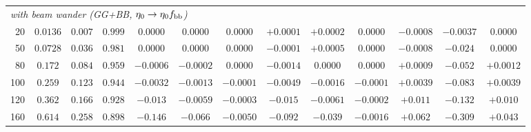 \documentclass[11pt,a4paper]{article}
\theoremstyle{plain}
\theoremstyle{remark}
\begin{document}
\begin{table}[htbp]
\begin{tabular}{rcccccccccccc}
\midrule
\multicolumn{13}{l}{\emph{with beam wander (GG+BB, $\eta_0\to\eta_0f_{\rm bb}$)}} \\
20 & $0.0136$ & $0.007$ & $0.999$ & $0.0000$ & $0.0000$ & $0.0000$ & $+0.0001$ & $+0.0002$ & $0.0000$ & $-0.0008$ & $-0.0037$ & $0.0000$ \\
50 & $0.0728$ & $0.036$ & $0.981$ & $0.0000$ & $0.0000$ & $0.0000$ & $-0.0001$ & $+0.0005$ & $0.0000$ & $-0.0008$ & $-0.024$ & $0.0000$ \\
80 & $0.172$ & $0.084$ & $0.959$ & $-0.0006$ & $-0.0002$ & $0.0000$ & $-0.0014$ & $0.0000$ & $0.0000$ & $+0.0009$ & $-0.052$ & $+0.0012$ \\
100 & $0.259$ & $0.123$ & $0.944$ & $-0.0032$ & $-0.0013$ & $-0.0001$ & $-0.0049$ & $-0.0016$ & $-0.0001$ & $+0.0039$ & $-0.083$ & $+0.0039$ \\
120 & $0.362$ & $0.166$ & $0.928$ & $-0.013$ & $-0.0059$ & $-0.0003$ & $-0.015$ & $-0.0061$ & $-0.0002$ & $+0.011$ & $-0.132$ & $+0.010$ \\
160 & $0.614$ & $0.258$ & $0.898$ & $-0.146$ & $-0.066$ & $-0.0050$ & $-0.092$ & $-0.039$ & $-0.0016$ & $+0.062$ & $-0.309$ & $+0.043$ \\

\bottomrule
\end{tabular}
\end{table}
\end{document}
